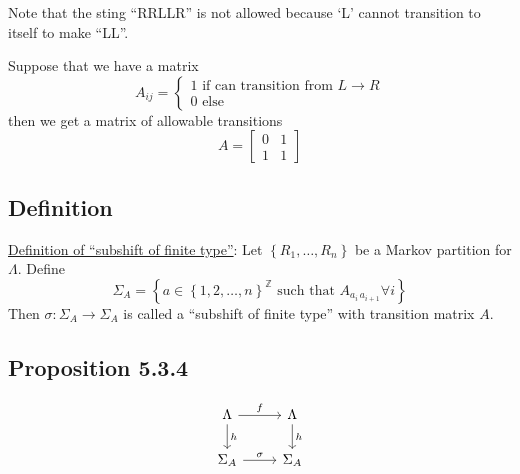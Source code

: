 \documentclass{article}
\begin{document}
Note that the sting ``RRLLR'' is not allowed because `L' cannot transition to itself to make ``LL''.

Suppose that we have a matrix 
\[
A_{ij} = \begin{cases}
    1 \text{ if can transition from } L\to R\\
    0 \text{ else}
\end{cases}
\]
then we get a matrix of allowable transitions 
\[
A = \begin{bmatrix}
    0 & 1 \\ 1 & 1
\end{bmatrix}
\]

\subsection{Definition}

\underline{Definition of ``subshift of finite type''}: Let $\left\{R_1,\ldots, R_n\right\}$ be a Markov partition for $\Lambda$. Define 
\[
\Sigma_A = \left\{ a \in\left\{1,2,\ldots, n\right\}^{\mathbb{Z}} \text{ such that } A_{a_i\, a_{i+1}} \forall i \right\}
\]
Then $\sigma: \Sigma_A \to \Sigma_A$ is called a ``subshift of finite type'' with transition matrix $A$.

\subsection{Proposition 5.3.4}
\[
\begin{tikzcd}
\Lambda \arrow{r}{f} \arrow{d}{h} & \Lambda \arrow{d}{h} \\
\Sigma_A \arrow{r}{\sigma} & \Sigma_A
\end{tikzcd}
\]
\end{document}
